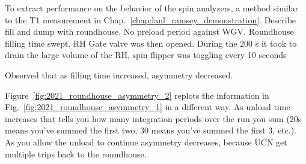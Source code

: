  To extract performance on the behavior of the spin analyzers, a method similar to the T1 measurement in Chap.~\ref{chap:lanl_ramsey_demonstration}. Describe fill and dump with roundhouse. No preload period against WGV. Roundhouse filling time swept. RH Gate valve was then opened. During the 200 s it took to drain the large volume of the RH, spin flipper was toggling every 10 seconds

Observed that as filling time increased, asymmetry decreased. 

Figure~\ref{fig:2021_roundhouse_asymmetry_2} replots the information in Fig.~\ref{fig:2021_roundhouse_asymmetry_1} in a different way. As unload time increases that tells you how many integration periods over the run you sum (20s means you've summed the first two, 30 means you've summed the first 3, etc.). As you allow the unload to continue asymmetry decreases, because UCN get multiple trips back to the roundhouse.


